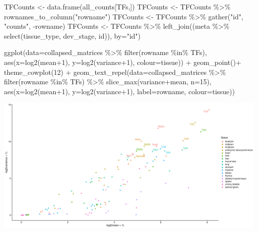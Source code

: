 \documentclass[
]{article}
\newenvironment{Shaded}{\begin{snugshade}}{\end{snugshade}}
\newcommand{\AttributeTok}[1]{\textcolor[rgb]{0.77,0.63,0.00}{#1}}
\newcommand{\DecValTok}[1]{\textcolor[rgb]{0.00,0.00,0.81}{#1}}
\newcommand{\FunctionTok}[1]{\textcolor[rgb]{0.00,0.00,0.00}{#1}}
\newcommand{\NormalTok}[1]{#1}
\newcommand{\OtherTok}[1]{\textcolor[rgb]{0.56,0.35,0.01}{#1}}
\newcommand{\SpecialCharTok}[1]{\textcolor[rgb]{0.00,0.00,0.00}{#1}}
\newcommand{\StringTok}[1]{\textcolor[rgb]{0.31,0.60,0.02}{#1}}
\begin{document}
\begin{Shaded}
\begin{Highlighting}[]
\NormalTok{TFCounts }\OtherTok{\textless{}{-}} \FunctionTok{data.frame}\NormalTok{(all\_counts[TFs,])}
\NormalTok{TFCounts }\OtherTok{\textless{}{-}}\NormalTok{ TFCounts }\SpecialCharTok{\%\textgreater{}\%} \FunctionTok{rownames\_to\_column}\NormalTok{(}\StringTok{"rowname"}\NormalTok{)}
\NormalTok{TFCounts }\OtherTok{\textless{}{-}}\NormalTok{ TFCounts }\SpecialCharTok{\%\textgreater{}\%} \FunctionTok{gather}\NormalTok{(}\StringTok{"id"}\NormalTok{, }\StringTok{"counts"}\NormalTok{, }\SpecialCharTok{{-}}\NormalTok{rowname)}
\NormalTok{TFCounts }\OtherTok{\textless{}{-}}\NormalTok{ TFCounts }\SpecialCharTok{\%\textgreater{}\%} \FunctionTok{left\_join}\NormalTok{((meta }\SpecialCharTok{\%\textgreater{}\%} \FunctionTok{select}\NormalTok{(tissue\_type, dev\_stage, id)), }\AttributeTok{by=}\StringTok{"id"}\NormalTok{)}

\FunctionTok{ggplot}\NormalTok{(}\AttributeTok{data=}\NormalTok{collapsed\_matrices }\SpecialCharTok{\%\textgreater{}\%} \FunctionTok{filter}\NormalTok{(rowname }\SpecialCharTok{\%in\%}\NormalTok{ TFs), }\FunctionTok{aes}\NormalTok{(}\AttributeTok{x=}\FunctionTok{log2}\NormalTok{(mean}\SpecialCharTok{+}\DecValTok{1}\NormalTok{), }\AttributeTok{y=}\FunctionTok{log2}\NormalTok{(variance}\SpecialCharTok{+}\DecValTok{1}\NormalTok{), }\AttributeTok{colour=}\NormalTok{tissue)) }\SpecialCharTok{+} \FunctionTok{geom\_point}\NormalTok{()}\SpecialCharTok{+} \FunctionTok{theme\_cowplot}\NormalTok{(}\DecValTok{12}\NormalTok{) }\SpecialCharTok{+} 
  \FunctionTok{geom\_text\_repel}\NormalTok{(}\AttributeTok{data=}\NormalTok{collapsed\_matrices }\SpecialCharTok{\%\textgreater{}\%} \FunctionTok{filter}\NormalTok{(rowname }\SpecialCharTok{\%in\%}\NormalTok{ TFs) }\SpecialCharTok{\%\textgreater{}\%} \FunctionTok{slice\_max}\NormalTok{(variance}\SpecialCharTok{+}\NormalTok{mean, }\AttributeTok{n=}\DecValTok{15}\NormalTok{), }\FunctionTok{aes}\NormalTok{(}\AttributeTok{x=}\FunctionTok{log2}\NormalTok{(mean}\SpecialCharTok{+}\DecValTok{1}\NormalTok{), }\AttributeTok{y=}\FunctionTok{log2}\NormalTok{(variance}\SpecialCharTok{+}\DecValTok{1}\NormalTok{), }\AttributeTok{label=}\NormalTok{rowname, }\AttributeTok{colour=}\NormalTok{tissue)) }
\end{Highlighting}
\end{Shaded}

\includegraphics{Exploration_files/figure-latex/unnamed-chunk-21-1.pdf}
\end{document}
